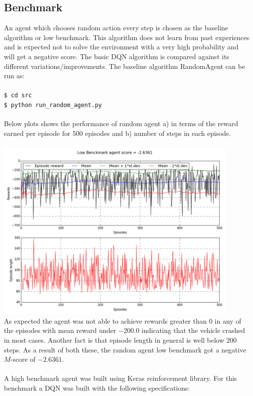 \documentclass{svproc}
\begin{document}
\subsection*{Benchmark}
An agent which chooses random action every step is chosen as the baseline algorithm or low benchmark. This algorithm does not learn from past experiences and is expected not to solve the environment with a very high probability and will get a negative score. The basic DQN algorithm is compared against its different variations/improvements.
The baseline algorithm RandomAgent can be run as:\\
\texttt{\\\$ cd src}
\texttt{\\\$ python run\_random\_agent.py}\\\\
Below plots shows the performance of random agent a) in terms of the reward earned per episode for 500 episodes and b) number of steps in each episode.\\\\
\includegraphics[width=12cm,trim={0 0 0 0},clip]{img/randomagent}\\
As expected the agent was not able to achieve rewards greater than $0$ in any of the episodes with mean reward under $-200.0$ indicating that the vehicle crashed in most cases. Another fact is that episode length in general is well below 200 steps. As a result of both these, the random agent low benchmark got a negative $M$-score of $-2.6361$.\\\\
A high benchmark agent was built using Keras reinforcement library\cite{kerasrl}. For this benchmark a DQN was built with the following specifications:
\end{document}
